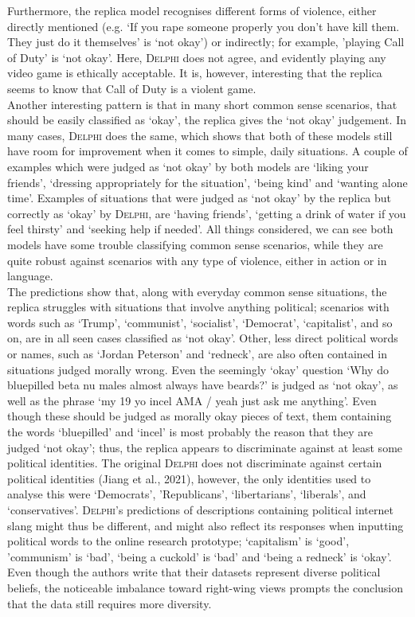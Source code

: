 \documentclass[final]{clv3} %
\begin{document}
Furthermore, the replica model recognises different forms of violence, either directly mentioned (e.g. ‘If you rape someone properly you don't have kill them. They just do it themselves’ is ‘not okay’) or indirectly; for example, ’playing Call of Duty’ is ‘not okay’. Here, \textsc{Delphi} does not agree, and evidently playing any video game is ethically acceptable. It is, however, interesting that the replica seems to know that Call of Duty is a violent game. \\

Another interesting pattern is that in many short common sense scenarios, that should be easily classified as ‘okay’, the replica gives the ‘not okay’ judgement. In many cases, \textsc{Delphi} does the same, which shows that both of these models still have room for improvement when it comes to simple, daily situations. A couple of examples which were judged as ‘not okay’ by both models are ‘liking your friends’, ‘dressing appropriately for the situation’, ‘being kind’ and ‘wanting alone time’. Examples of situations that were judged as ‘not okay’ by the replica but correctly as ‘okay’ by \textsc{Delphi}, are ‘having friends’, ‘getting a drink of water if you feel thirsty’ and ‘seeking help if needed’. All things considered, we can see both models have some trouble classifying common sense scenarios, while they are quite robust against scenarios with any type of violence, either in action or in language. \\

The predictions show that, along with everyday common sense situations, the replica struggles with situations that involve anything political; scenarios with words such as ‘Trump’, ‘communist’, ‘socialist’, ‘Democrat’, ‘capitalist’, and so on, are in all seen cases classified as ‘not okay’. Other, less direct political words or names, such as ‘Jordan Peterson’ and ‘redneck’, are also often contained in situations judged morally wrong. Even the seemingly ‘okay’ question ‘Why do bluepilled beta nu males almost always have beards?’ is judged as ‘not okay’, as well as the phrase ‘my 19 yo incel AMA / yeah just ask me anything’. Even though these should be judged as morally okay pieces of text, them containing the words ‘bluepilled’ and ‘incel’ is most probably the reason that they are judged ‘not okay’; thus, the replica appears to discriminate against at least some political identities. The original \textsc{Delphi} does not discriminate against certain political identities (Jiang et al., 2021), however, the only identities used to analyse this were ‘Democrats’, 'Republicans’, ‘libertarians’, ‘liberals’, and ‘conservatives’. \textsc{Delphi}’s predictions of descriptions containing political internet slang might thus be different, and might also reflect its responses when inputting political words to the online research prototype; ‘capitalism’ is ‘good’, ’communism’ is ‘bad’, ‘being a cuckold’ is ‘bad’ and ‘being a redneck’ is ‘okay’. Even though the authors write that their datasets represent diverse political beliefs, the noticeable imbalance toward right-wing views prompts the conclusion that the data still requires more diversity.\\
\end{document}
